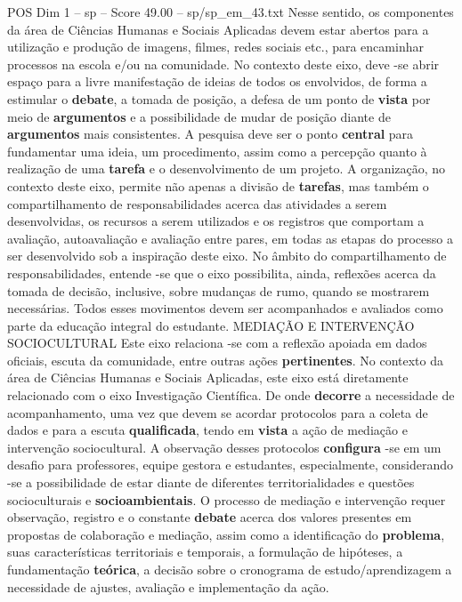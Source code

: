 \begin{textsample}{POS Dim 1 – sp – Score 49.00 – sp/sp\_em\_43.txt}
Nesse sentido, os componentes da área de Ciências Humanas e Sociais Aplicadas devem estar abertos para a utilização e produção de imagens, filmes, redes sociais etc., para encaminhar processos na escola e/ou na comunidade.
No contexto deste eixo, deve -se abrir espaço para a livre manifestação de ideias de todos os envolvidos, de forma a estimular o \textbf{debate}, a tomada de posição, a defesa de um ponto de \textbf{vista} por meio de \textbf{argumentos} e a possibilidade de mudar de posição diante de \textbf{argumentos} mais consistentes.
A pesquisa deve ser o ponto \textbf{central} para fundamentar uma ideia, um procedimento, assim como a percepção quanto à realização de uma \textbf{tarefa} e o desenvolvimento de um projeto.
A organização, no contexto deste eixo, permite não apenas a divisão de \textbf{tarefas}, mas também o compartilhamento de responsabilidades acerca das atividades a serem desenvolvidas, os recursos a serem utilizados e os registros que comportam a avaliação, autoavaliação e avaliação entre pares, em todas as etapas do processo a ser desenvolvido sob a inspiração deste eixo.
No âmbito do compartilhamento de responsabilidades, entende -se que o eixo possibilita, ainda, reflexões acerca da tomada de decisão, inclusive, sobre mudanças de rumo, quando se mostrarem necessárias.
Todos esses movimentos devem ser acompanhados e avaliados como parte da educação integral do estudante.
MEDIAÇÃO E INTERVENÇÃO SOCIOCULTURAL Este eixo relaciona -se com a reflexão apoiada em dados oficiais, escuta da comunidade, entre outras ações \textbf{pertinentes}.
No contexto da área de Ciências Humanas e Sociais Aplicadas, este eixo está diretamente relacionado com o eixo Investigação Científica.
De onde \textbf{decorre} a necessidade de acompanhamento, uma vez que devem se acordar protocolos para a coleta de dados e para a escuta \textbf{qualificada}, tendo em \textbf{vista} a ação de mediação e intervenção sociocultural.
A observação desses protocolos \textbf{configura} -se em um desafio para professores, equipe gestora e estudantes, especialmente, considerando -se a possibilidade de estar diante de diferentes territorialidades e questões socioculturais e \textbf{socioambientais}.
O processo de mediação e intervenção requer observação, registro e o constante \textbf{debate} acerca dos valores presentes em propostas de colaboração e mediação, assim como a identificação do \textbf{problema}, suas características territoriais e temporais, a formulação de hipóteses, a fundamentação \textbf{teórica}, a decisão sobre o cronograma de estudo/aprendizagem a necessidade de ajustes, avaliação e implementação da ação.

\end{textsample}
